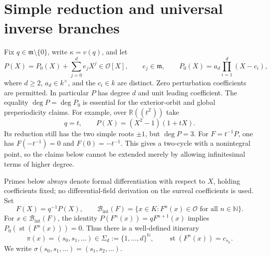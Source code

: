 \documentclass[11pt,a4paper]{article}
\numberwithin{equation}{section}
\theoremstyle{plain}
\theoremstyle{definition}
\theoremstyle{remark}
\newcommand{\R}{\mathbb R}
\newcommand{\Z}{\mathbb Z}
\newcommand{\N}{\mathbb N}
\newcommand{\OO}{\mathcal O}
\newcommand{\mm}{\mathfrak m}
\newcommand{\BI}{\mathcal B_{\mathrm{int}}}
\newcommand{\Sig}{\Sigma_d}
\newcommand{\sh}{\sigma}
\newcommand{\st}{\operatorname{st}}
\begin{document}
\section{Simple reduction and universal inverse branches}
\label{epd:sec:branches}
Fix $q\in\mm\setminus\{0\}$, write $\kappa=v(q)$, and let
\begin{equation}\label{epd:eq:polynomial}
 P(X)=P_0(X)+\sum_{j=0}^d e_jX^j\in\OO[X],
 \qquad e_j\in\mm,
 \qquad P_0(X)=a_d\prod_{i=1}^d(X-c_i),
\end{equation}
where $d\geq2$, $a_d\in k^\times$, and the $c_i\in k$ are distinct.
Zero perturbation coefficients are permitted. In particular $P$ has
degree $d$ and unit leading coefficient. The equality
$\deg P=\deg P_0$ is essential for the exterior-orbit and global
preperiodicity claims. For example, over $\R((t^\Z))$ take
\[
 q=t,\qquad P(X)=(X^2-1)(1+tX).
\]
Its reduction still has the two simple roots $\pm1$, but $\deg P=3$.
For $F=t^{-1}P$, one has $F(-t^{-1})=0$ and $F(0)=-t^{-1}$.
This gives a two-cycle with a nonintegral point, so the claims below
cannot be extended merely by allowing infinitesimal terms of higher degree.

Primes below always denote
formal differentiation with respect to $X$, holding coefficients fixed;
no differential-field derivation on the surreal coefficients is used. Set
\[
 F(X)=q^{-1}P(X),\qquad
 \BI(F)=\{x\in K:F^n(x)\in\OO\text{ for all }n\in\N\}.
\]
For $x\in\BI(F)$, the identity $P(F^n(x))=qF^{n+1}(x)$ implies
$P_0(\st(F^n(x)))=0$. Thus there is a well-defined itinerary
\[
 \pi(x)=(s_0,s_1,\ldots)\in\Sig:=\{1,\ldots,d\}^{\N},
 \qquad \st(F^n(x))=c_{s_n}.
\]
We write $\sh(s_0,s_1,\ldots)=(s_1,s_2,\ldots)$.
\end{document}
